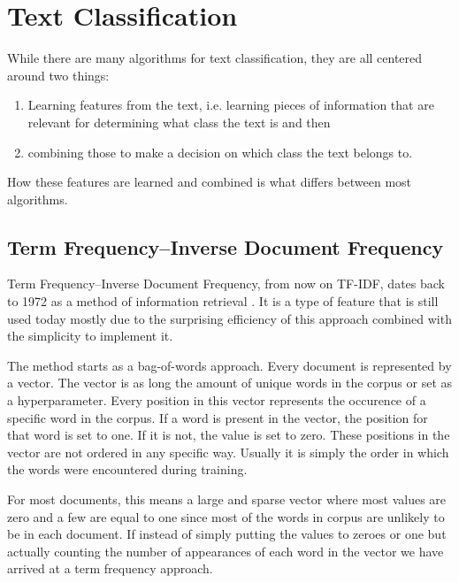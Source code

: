 \documentclass[nofilelist]{cslthse-msc}
\begin{document}
\section{Text Classification}

While there are many algorithms for text classification, they are all centered around two things:
\begin{enumerate}
    \item Learning features from the text, i.e. learning pieces of information that are relevant for determining what class the text is and then
    \item combining those to make a decision on which class the text belongs to. 
\end{enumerate}

How these features are learned and combined is what differs between most algorithms.

\subsection{Term Frequency--Inverse Document Frequency}

Term Frequency--Inverse Document Frequency, from now on TF-IDF, dates back to 1972 as a method of information retrieval \cite{jones1972statistical}. It is a type of feature that is still used today mostly due to the surprising efficiency of this approach combined with the simplicity to implement it.

The method starts as a bag-of-words approach. Every document is represented by a vector. The vector is as long the amount of unique words in the corpus or set as a hyperparameter. Every position in this vector represents the occurence of a specific word in the corpus. If a word is present in the vector, the position for that word is set to one. If it is not, the value is set to zero. These positions in the vector are not ordered in any specific way. Usually it is simply the order in which the words were encountered during training.

For most documents, this means a large and sparse vector where most values are zero and a few are equal to one since most of the words in corpus are unlikely to be in each document. If instead of simply putting the values to zeroes or one but actually counting the number of appearances of each word in the vector we have arrived at a term frequency approach.

\end{document}
